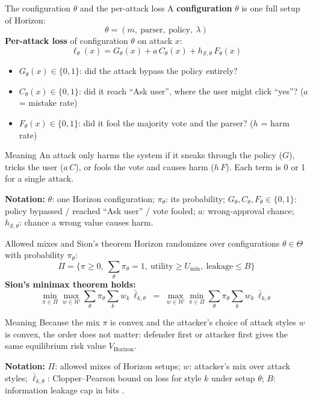 \documentclass[aspectratio=169,11pt]{beamer}
\providecommand{\notation}[1]{\par\vfill{\scriptsize\textcolor{gray!80!black}{\textbf{Notation:} #1}}}
\begin{document}
\begin{frame}{The configuration $\theta$ and the per-attack loss}
  A \textbf{configuration} $\theta$ is one full setup of Horizon:
  \[
    \theta = (m,\ \text{parser},\ \text{policy},\ \lambda)
  \]
  \small
  \textbf{Per-attack loss} of configuration $\theta$ on attack $x$:
  \[
    \ell_\theta(x) = G_\theta(x) + a\,C_\theta(x) + h_{\mathcal{S},\theta}\,F_\theta(x)
  \]
  \begin{itemize}
    \item $G_\theta(x) \in \{0,1\}$: did the attack bypass the policy entirely?
    \item $C_\theta(x) \in \{0,1\}$: did it reach ``Ask user'', where the user might click ``yes''? ($a$ = mistake rate)
    \item $F_\theta(x) \in \{0,1\}$: did it fool the majority vote and the parser? ($h$ = harm rate)
  \end{itemize}
  \begin{block}{Meaning}
    An attack only harms the system if it sneaks through the policy ($G$), tricks the user ($a\,C$), or fools the vote and causes harm ($h\,F$). Each term is 0 or 1 for a single attack.
  \end{block}
  \notation{$\theta$: one Horizon configuration; $\pi_\theta$: its probability; $G_\theta,C_\theta,F_\theta\in\{0,1\}$: policy bypassed / reached ``Ask user'' / vote fooled; $a$: wrong-approval chance; $h_{\mathcal{S},\theta}$: chance a wrong value causes harm.}
\end{frame}

\begin{frame}{Allowed mixes and Sion's theorem \cite{sion1958minimax}}
  \small
  Horizon randomizes over configurations $\theta \in \Theta$ with probability $\pi_\theta$:
  \[
    \Pi = \Big\{\pi \ge 0,\ \textstyle\sum_\theta \pi_\theta = 1,\ \text{utility} \ge U_{\min},\ \text{leakage} \le B\Big\}
  \]
  \textbf{Sion's minimax theorem holds:}
  \[
    \min_{\pi \in \Pi} \max_{w \in \mathcal{W}} \sum_\theta \pi_\theta \sum_k w_k\,\bar\ell_{k,\theta}
    \;=\;
    \max_{w \in \mathcal{W}} \min_{\pi \in \Pi} \sum_\theta \pi_\theta \sum_k w_k\,\bar\ell_{k,\theta}
  \]
  \begin{block}{Meaning}
    Because the mix $\pi$ is convex and the attacker's choice of attack styles $w$ is convex, the order does not matter: defender first or attacker first gives the same equilibrium risk value $V_{\mathrm{Horizon}}$.
  \end{block}
  \notation{$\Pi$: allowed mixes of Horizon setups; $w$: attacker's mix over attack styles; $\bar\ell_{k,\theta}$: Clopper--Pearson bound on loss for style $k$ under setup $\theta$; $B$: information leakage cap in bits \cite{smith2009qif}.}
\end{frame}
\end{document}
